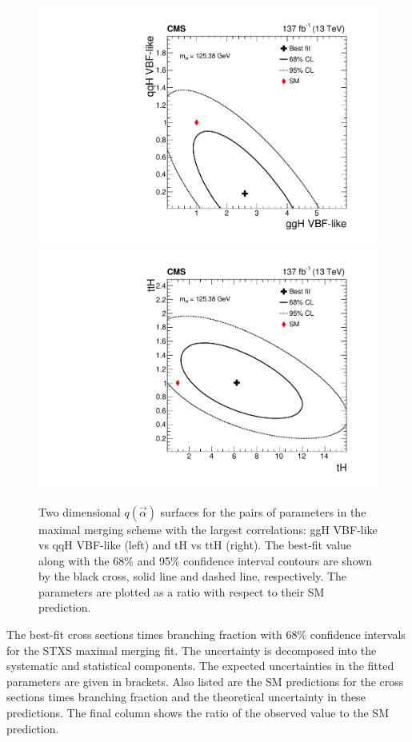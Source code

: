 \begin{figure}[htb!]
  \centering
  \includegraphics[width=.4\textwidth]{Figures/hgg_results/scan2D_r_ggH_VBFlike_vs_r_qqH_VBFlike_obs.pdf}
  \includegraphics[width=.4\textwidth]{Figures/hgg_results/scan2D_r_tH_vs_r_ttH_obs.pdf}
  \caption[Two dimensional likelihood scans for highly-correlated parameters in the maximal merging scheme]
  {
    Two dimensional $q(\vec{\alpha})$ surfaces for the pairs of parameters in the maximal merging scheme with the largest correlations: ggH VBF-like vs qqH VBF-like (left) and tH vs ttH (right). The best-fit value along with the 68\% and 95\% confidence interval contours are shown by the black cross, solid line and dashed line, respectively. The parameters are plotted as a ratio with respect to their SM prediction.
  }
  \label{fig:2d_maximal}
\end{figure}

\begin{table}[htbp]
  \centering
  \scriptsize
  \renewcommand{\arraystretch}{2}
  \setlength{\tabcolsep}{2.2pt}
  \caption[Results of the maximal merging fit]
  {
    The best-fit cross sections times branching fraction with 68\% confidence intervals for the STXS maximal merging fit. The uncertainty is decomposed into the systematic and statistical components. The expected uncertainties in the fitted parameters are given in brackets. Also listed are the SM predictions for the cross sections times branching fraction and the theoretical uncertainty in these predictions. The final column shows the ratio of the observed value to the SM prediction.
  }
  \label{tab:stage1p2_maximal_results}
  \hspace*{-1cm}
  
  \hspace*{-1cm}
\end{table}

